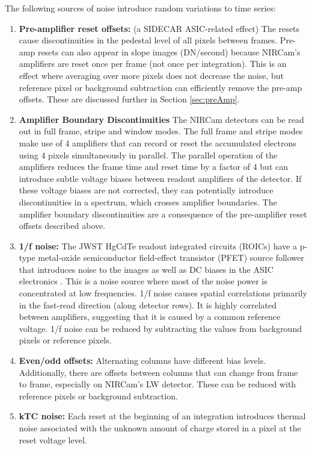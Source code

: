 \documentclass[]{aastex62}
\begin{document}
The following sources of noise introduce random variations to time series:
\begin{enumerate}[noitemsep]
	\item \textbf{Pre-amplifier reset offsets:} (a SIDECAR ASIC-related effect) \label{it:preAmpOffsets}
The resets cause discontinuities in the pedestal level of all pixels between frames.
Pre-amp resets can also appear in slope images (DN/second) because NIRCam's amplifiers are reset once per frame (not once per integration).
This is an effect where averaging over more pixels does not decrease the noise, but reference pixel or background subtraction can efficiently remove the pre-amp offsets.
These are discussed further in Section \ref{sec:preAmp}.
	\item \textbf{Amplifier Boundary Discontinuities} The NIRCam detectors can be read out in full frame, stripe and window modes. The full frame and stripe modes make use of 4 amplifiers that can record or reset the accumulated electrons using 4 pixels simultaneously in parallel. The parallel operation of the amplifiers reduces the frame time and reset time by a factor of 4 but can introduce subtle voltage biases between readout amplifiers of the detector. If these voltage biases are not corrected, they can potentially introduce discontinuities in a spectrum, which crosses amplifier boundaries.
	The amplifier boundary discontinuities are a consequence of the pre-amplifier reset offsets described above.
	\item \textbf{1/f noise:} The JWST HgCdTe readout integrated circuits (ROICs) have a p-type metal-oxide semiconductor field-effect transistor (PFET) source follower that introduces noise to the images as well as DC biases in the ASIC electronics \citep{rauscher2011irsSquared}.
	This is a noise source where most of the noise power is concentrated at low frequencies.
	1/f noise causes spatial correlations primarily in the fast-read direction (along detector rows). It is highly correlated between amplifiers, suggesting that it is caused by a common reference voltage. 1/f noise can be reduced by subtracting the values from background pixels or reference pixels.
	\item \textbf{Even/odd offsets:} Alternating columns have different bias levels. Additionally, there are offsets between columns that can change from frame to frame, especially on NIRCam's LW detector.
	These can be reduced with reference pixels or background subtraction.
	\item \textbf{kTC noise:} Each reset at the beginning of an integration introduces thermal noise associated with the unknown amount of charge stored in a pixel at the reset voltage level.

\end{enumerate}
\end{document}
